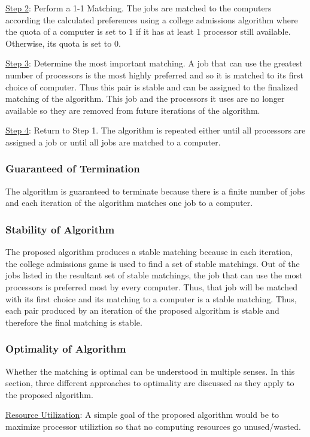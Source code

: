 \documentclass[conference]{IEEEtran}
\begin{document}
\underline{Step 2}: Perform a 1-1 Matching.
The jobs are matched to the computers according the calculated preferences
using a college admissions algorithm where the quota of a computer is 
set to 1 if it has at least 1 processor still available. 
Otherwise, its quota is set to 0.

\underline{Step 3}: Determine the most important matching.
A job that can use the greatest number of processors is the
most highly preferred and so it is matched to its first choice
of computer. Thus this pair is stable and can be assigned to 
the finalized matching of the algorithm. 
This job and the processors it uses are no longer available
so they are removed from future iterations of the algorithm.

\underline{Step 4}: Return to Step 1.
The algorithm is repeated either until all processors are 
assigned a job or until all jobs are matched 
to a computer.

\subsubsection{Guaranteed of Termination}
The algorithm is guaranteed to terminate because there is a 
finite number of jobs and each iteration of the algorithm
matches one job to a computer.

\subsubsection{Stability of Algorithm}
The proposed algorithm produces a stable matching because in
each iteration, the college admissions game is used to find
a set of stable matchings.
Out of the jobs listed in the resultant set of stable matchings,
the job that can use the most processors is preferred most
by every computer. Thus, that job will be matched with its first 
choice and its matching to a computer is a stable matching.
Thus, each pair produced by an iteration of the proposed
algorithm is stable and therefore the final matching is stable.

\subsubsection{Optimality of Algorithm}
Whether the matching is optimal can be understood in multiple senses.
In this section, three different approaches to optimality are 
discussed as they apply to the proposed algorithm.

\underline{Resource Utilization}:
A simple goal of the proposed algorithm would be to 
maximize processor utiliztion so that no computing 
resources go unused/wasted.
\end{document}
